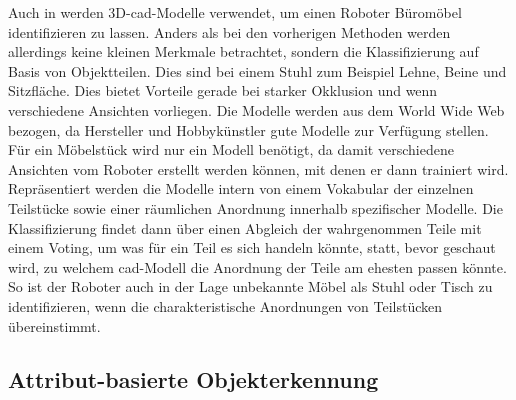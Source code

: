 Auch in \citep{modelsWWW} werden 3D-\gls{cad}-Modelle verwendet, um einen Roboter Büromöbel identifizieren zu lassen. Anders als bei den vorherigen Methoden werden allerdings keine kleinen Merkmale betrachtet, sondern die Klassifizierung auf Basis von Objektteilen. Dies sind bei einem Stuhl zum Beispiel Lehne, Beine und Sitzfläche. Dies bietet Vorteile gerade bei starker Okklusion und wenn verschiedene Ansichten vorliegen. Die Modelle werden aus dem World Wide Web bezogen, da Hersteller und Hobbykünstler gute Modelle zur Verfügung stellen. Für ein Möbelstück wird nur ein Modell benötigt, da damit verschiedene Ansichten vom Roboter erstellt werden können, mit denen er dann trainiert wird. Repräsentiert werden die Modelle intern von einem Vokabular der einzelnen Teilstücke sowie einer räumlichen Anordnung innerhalb spezifischer Modelle. Die Klassifizierung findet dann über einen Abgleich der wahrgenommen Teile mit einem Voting, um was für ein Teil es sich handeln könnte, statt, bevor geschaut wird, zu welchem \gls{cad}-Modell die Anordnung der Teile am ehesten passen könnte. So ist der Roboter auch in der Lage unbekannte Möbel als Stuhl oder Tisch zu identifizieren, wenn die charakteristische Anordnungen von Teilstücken übereinstimmt.   

\subsection{Attribut-basierte Objekterkennung}
\label{sec:aboi}

